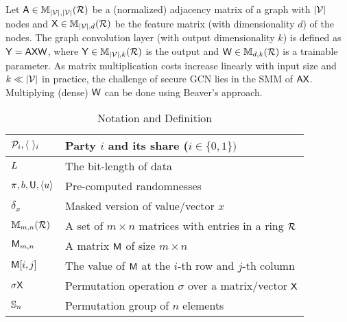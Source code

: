Let $\mathsf{A} \in \mathbb{M}_{|\mathcal{V}|,|\mathcal{V}|}(\mathcal{R})$ be a (normalized) adjacency matrix of a graph with $|\mathcal{V}|$ nodes and $\mathsf{X} \in \mathbb{M}_{|\mathcal{V}|, d}(\mathcal{R})$ be the feature matrix (with dimensionality $d$) of the nodes.
The graph convolution layer (with output dimensionality $k$) is defined as $\mathsf{Y} = \mathsf{A} \mathsf{X} \mathsf{W}$,
where $\mathsf{Y} \in \mathbb{M}_{|\mathcal{V}|, k}(\mathcal{R})$ is the output and $\mathsf{W} \in \mathbb{M}_{d, k}(\mathcal{R})$ is a trainable parameter.
As matrix multiplication costs increase linearly with input size and $k \ll |\mathcal{V}|$ in practice, the challenge of secure GCN
lies in the
SMM of $\mathsf{A} \mathsf{X}$.
Multiplying (dense) $\mathsf{W}$ can be done using Beaver's approach.

\begin{table}[!t]
\centering
\caption{Notation and Definition}
\label{tab:notation}
\setlength\tabcolsep{2pt}
\begin{tabular}{l|l}
\hline
$\pp_i, \l \ \r_i$& Party $i$ and its share ($i \in \{0, 1\})$
\\\hline
$L$ & The bit-length of data
\\\hline
$\pi,b,\mathsf{U},\langle u \rangle$ & Pre-computed randomnesses
\\\hline
$\delta_x$ & Masked version of value/vector $x$
\\\hline
$\mathbb{M}_{m, n}{(\mathcal{R})}$ & A set of ${m\times n}$ matrices with entries in a ring $\mathcal{R}$
\\\hline
$\mathsf{M}_{m,n}$ & A matrix $\mathsf{M}$ of size $m\times n$
\\\hline
$\mathsf{M}[i, j]$ & The value of $\mathsf{M}$ at the $i$-th row and $j$-th column
\\\hline
$\sigma\mathsf{X}$& Permutation operation $\sigma$ over a matrix/vector $\mathsf{X}$
\\\hline
$\mathbb{S}_n$ & Permutation group of $n$ elements
\\\hline
\end{tabular}
\end{table}
